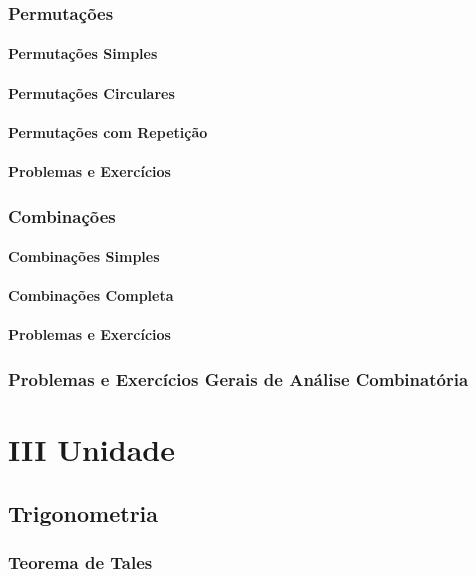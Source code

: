 \documentclass[12pt,a4paper]{book}
\begin{document}
		\section{Permutações}
			\subsection{Permutações Simples}
			\subsection{Permutações Circulares}
			\subsection{Permutações com Repetição}
			\subsection{Problemas e Exercícios}
		
		\section{Combinações}
			\subsection{Combinações Simples}
			\subsection{Combinações Completa}
			\subsection{Problemas e Exercícios}
		
		\section{Problemas e Exercícios Gerais de Análise Combinatória}

\part*{III Unidade}
\chapter{Trigonometria}
	\section{Teorema de Tales}
\end{document}
